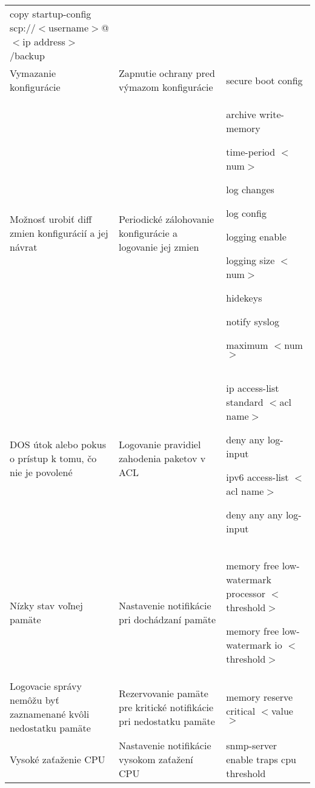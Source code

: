 \begin{longtable}[!htbp]{|L{10em}L{10em}>{\selectfont}L{34em}|}
	copy startup-config scp://$<$username$>$@$<$ip address$>$/backup\\
	
	
	
	
	Vymazanie konfigurácie	&Zapnutie ochrany pred výmazom konfigurácie	&secure boot config\\
	
	
	
	Možnosť urobiť diff zmien konfigurácií a jej návrat	&Periodické zálohovanie konfigurácie a logovanie jej zmien	&archive
	write-memory
	
	time-period $<$num$>$
	
	log changes
	
	log config
	
	logging enable
	
	logging size $<$num$>$
	
	
	hidekeys
	
	notify syslog
	
	maximum $<$num$>$\\
	
	
	
	
	 DOS útok alebo pokus o prístup k tomu, čo nie je povolené	&Logovanie pravidiel zahodenia paketov v ACL	&ip access-list standard $<$acl name$>$
	
	\hspace{0.5em}deny any log-input
	
	ipv6 access-list $<$acl name$>$
	
	\hspace{0.5em}deny any any log-input\\
	
	
	
	
	Nízky stav voľnej pamäte	&Nastavenie notifikácie pri dochádzaní pamäte	&memory free low-watermark processor $<$threshold$>$
	
	memory free low-watermark io $<$threshold$>$\\
	
	
	
	
	Logovacie správy nemôžu byť zaznamenané kvôli nedostatku pamäte	&Rezervovanie pamäte pre kritické notifikácie pri nedostatku pamäte	&memory reserve critical $<$value$>$ \\
	
	
	
	
	Vysoké zaťaženie CPU	&Nastavenie notifikácie vysokom zaťažení CPU	&snmp-server enable traps cpu threshold
	

\end{longtable}
